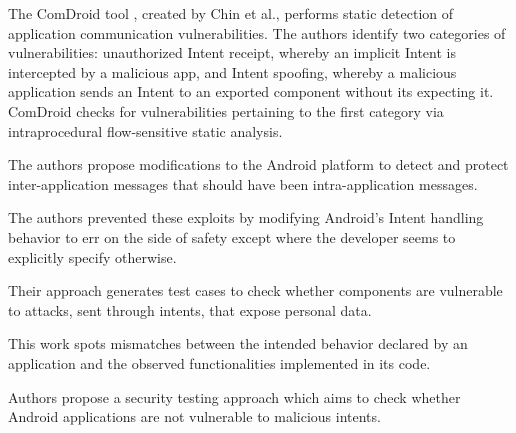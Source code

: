 The ComDroid tool \cite{CFGW:MOBISYS11}, created by Chin et al., performs static detection of application communication vulnerabilities. The authors identify two categories of vulnerabilities: unauthorized Intent receipt, whereby an implicit Intent is intercepted by a malicious app, and Intent spoofing, whereby a malicious application sends an Intent to an exported component without its expecting it. ComDroid checks for vulnerabilities pertaining to the first category via intraprocedural flow-sensitive static analysis.




The authors propose modifications to the Android platform to detect and protect inter-application messages that should have been intra-application messages.


The authors prevented these exploits by modifying Android's Intent handling behavior to err on the side of safety except where the developer seems to explicitly specify otherwise.


Their approach generates test cases to check whether components are vulnerable to attacks, sent through intents, that expose personal data.


This work spots mismatches between the intended behavior declared by an application and the observed functionalities implemented in its code.


Authors propose a security testing approach which aims to check whether Android applications are not vulnerable to malicious intents.